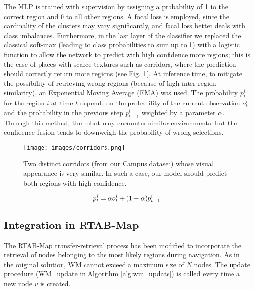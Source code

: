 \documentclass[letterpaper, 10 pt, conference]{ieeeconf}  %
\begin{document}
The MLP is trained with supervision by assigning a probability of 1 to the correct region and 0 to all other regions. A focal loss is employed, since the cardinality of the clusters may vary significantly, and focal loss better deals with class imbalances. Furthermore, in the last layer of the classifier we replaced the classical soft-max (leading to class probabilities to sum up to 1) with a logistic function to allow the network to predict with high confidence more regions; this is the case of places with scarce textures such as corridors, where the prediction should correctly return more regions (see Fig. \ref{fig:corridor}). At inference time, to mitigate the possibility of retrieving wrong regions (because of high inter-region similarity), an Exponential Moving Average (EMA) was used. The probability $p^i_t$ for the region $i$ at time $t$ depends on the probability of the current observation $o^i_t$ and the probability in the previous step $p^i_{t-1}$ weighted by a parameter $\alpha$. Through this method, the robot may encounter similar environments, but the confidence fusion tends to downweigh the probability of wrong selections. 

\begin{figure}[b]
\centering
\texttt{[image: images/corridors.png]}
\caption{Two distinct corridors (from our Campus dataset) whose visual appearance is very similar. In such a case, our model should predict both regions with high confidence.}
\label{fig:corridor}
\end{figure} 


\begin{equation} \centering \label{eqn:exp}
    p^i_t = \alpha o^i_t + (1-\alpha)p^i_{t-1}
\end{equation}


{\let\clearpage\relax \subsection{Integration in RTAB-Map}}
The RTAB-Map transfer-retrieval process has been modified to incorporate the retrieval of nodes belonging to the most likely regions during navigation. As in the original solution, WM cannot exceed a maximum size of $N$ nodes. The update procedure (WM\_update in Algorithm \ref{alg:wm_update}) is called every time a new node $v$ is created. 
\end{document}
